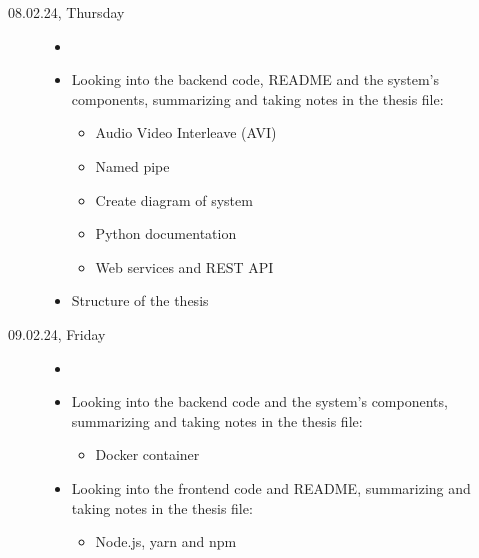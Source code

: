 \documentclass[a4, 11pt]{scrartcl}
\begin{document}
\begin{description}










\item[08.02.24, Thursday]
\begin{itemize}
	\item[]
	\item Looking into the backend code, README and the system's components, summarizing and taking notes in the thesis file:
	\begin{itemize}
		\item Audio Video Interleave (AVI)
		\item Named pipe
		\item Create diagram of system
		\item Python documentation
		\item Web services and REST API
	\end{itemize}
	\item Structure of the thesis
\end{itemize}














\item[09.02.24, Friday]
\begin{itemize}
	\item[]
	\item Looking into the backend code and the system's components, summarizing and taking notes in the thesis file:
	\begin{itemize}
		\item Docker container
	\end{itemize}
	\item Looking into the frontend code and README, summarizing and taking notes in the thesis file:
	\begin{itemize}
		\item Node.js, yarn and npm
	\end{itemize}
\end{itemize}




		
		
\end{description}
	
\end{document}
